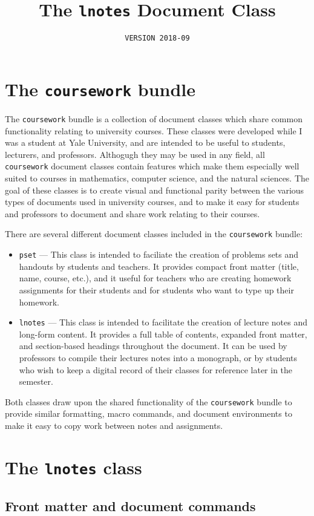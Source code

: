 \documentclass{lnotes}
\title{The \texttt{lnotes} Document Class}
\subtitle{\texttt{VERSION 2018-09}}
\begin{document}
\section{The \texttt{coursework} bundle}

The \texttt{coursework} bundle is a collection of document classes which share common functionality relating to university courses. These classes were developed while I was a student at Yale University, and are intended to be useful to students, lecturers, and professors. Althogugh they may be used in any field, all \texttt{coursework} document classes contain features which make them especially well suited to courses in mathematics, computer science, and the natural sciences. The goal of these classes is to create visual and functional parity between the various types of documents used in university courses, and to make it easy for students and professors to document and share work relating to their courses.

There are several different document classes included in the \texttt{coursework} bundle:
\begin{itemize}
\item \texttt{pset} --- This class is intended to faciliate the creation of problems sets and handouts by students and teachers. It provides compact front matter (title, name, course, etc.), and it useful for teachers who are creating homework assignments for their students and for students who want to type up their homework.
\item \texttt{lnotes} --- This class is intended to facilitate the creation of lecture notes and long-form content. It provides a full table of contents, expanded front matter, and section-based headings throughout the document. It can be used by professors to compile their lectures notes into a monograph, or by students who wish to keep a digital record of their classes for reference later in the semester.
\end{itemize}
Both classes draw upon the shared functionality of the \texttt{coursework} bundle to provide similar formatting, macro commands, and document environments to make it easy to copy work between notes and assignments.

\section{The \texttt{lnotes} class}

\subsection{Front matter and document commands}
\end{document}
